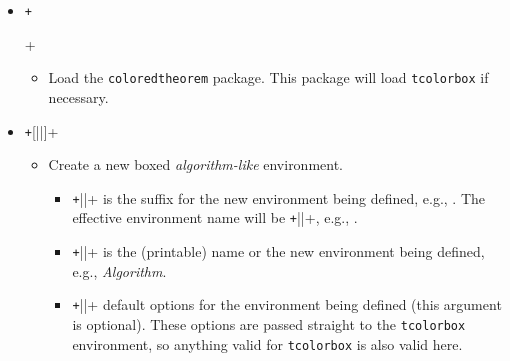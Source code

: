 \documentclass{article}
\begin{document}
\begin{itemize}
  \item \texttt+\usepackage{coloredtheorem}+
  \begin{itemize}
      \item Load the \texttt{coloredtheorem} package.
            This package will load \texttt{tcolorbox} if necessary.
  \end{itemize}

  \item \texttt+[||]+
  \begin{itemize}
    \item Create a new boxed \emph{algorithm-like} environment.
    \begin{itemize}
      \item \texttt+||+ is the suffix for the
            new environment being defined, e.g., . The effective environment name will be \texttt+||+, e.g., .
      \item \texttt+||+ is the (printable) name
            or the new environment being defined, e.g., \emph{Algorithm}.
      \item \texttt+||+ default
            options for the environment being defined (this argument is optional).
            These options are passed straight to the \texttt{tcolorbox} environment,
            so anything valid for \texttt{tcolorbox} is also valid here.
    \end{itemize}
  \end{itemize}


\end{itemize}
\end{document}
